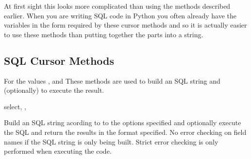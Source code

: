 \documentclass{howto}
\begin{document}
At first sight this looks more complicated than using the methods described earlier. When you are writing SQL code in Python you often already have the variables in the form required by these cursor methods and so it is actually easier to use these methods than putting together the parts into a string. 


\subsection{SQL Cursor Methods}

For the values ,  and \var{}
These methods are used to build an SQL string and (optionally) to execute the result.

\begin{methoddesc}{select}{, , }

Build an SQL string acording to to the options specified and optionally execute the SQL and return the results in the format specified. No error checking on field names if the SQL string is only being built. Strict error checking is only performed when executing the code.


\end{methoddesc}
\end{document}
